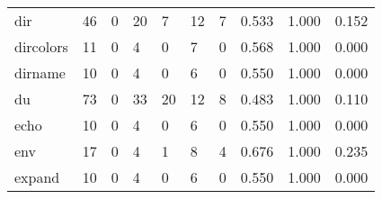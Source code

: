 \begin{longtable}{lp{1.3cm}p{1.3cm}p{1.3cm}p{1.3cm}p{1.3cm}p{1.3cm}p{1.3cm}p{1.3cm}p{1.3cm}}
dir       &                     46 &                                             0 &                                           20 &                                           7 &                                           12 &                                          7 &                                0.533 &                                  1.000 &                                0.152 \\
dircolors &                     11 &                                             0 &                                            4 &                                           0 &                                            7 &                                          0 &                                0.568 &                                  1.000 &                                0.000 \\
dirname   &                     10 &                                             0 &                                            4 &                                           0 &                                            6 &                                          0 &                                0.550 &                                  1.000 &                                0.000 \\
du        &                     73 &                                             0 &                                           33 &                                          20 &                                           12 &                                          8 &                                0.483 &                                  1.000 &                                0.110 \\
echo      &                     10 &                                             0 &                                            4 &                                           0 &                                            6 &                                          0 &                                0.550 &                                  1.000 &                                0.000 \\
env       &                     17 &                                             0 &                                            4 &                                           1 &                                            8 &                                          4 &                                0.676 &                                  1.000 &                                0.235 \\
expand    &                     10 &                                             0 &                                            4 &                                           0 &                                            6 &                                          0 &                                0.550 &                                  1.000 &                                0.000 \\

\end{longtable}
